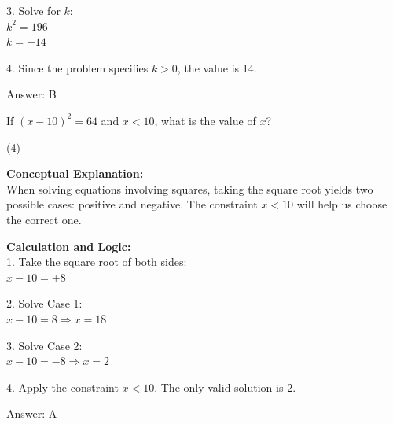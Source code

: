 \documentclass[11pt,paper=a4,answers]{exam}
\begin{document}
\begin{questions}
\begin{solution}
\vspace{10pt}

3. Solve for $k$: \\
   $k^2 = 196$ \\
   $k = \pm 14$

\vspace{10pt}

4. Since the problem specifies $k > 0$, the value is 14.

\vspace{20pt}

Answer: \colorbox{yellow!100}{B}
\end{solution}

\vspace{30pt}

\question
If $(x - 10)^2 = 64$ and $x < 10$, what is the value of $x$?
\begin{tasks}(4)
\end{tasks}

\begin{solution}
\textbf{Conceptual Explanation:} \\
When solving equations involving squares, taking the square root yields two possible cases: positive and negative. The constraint $x < 10$ will help us choose the correct one.

\vspace{15pt}

\textbf{Calculation and Logic:} \\
1. Take the square root of both sides: \\
   $x - 10 = \pm 8$

\vspace{10pt}

2. Solve Case 1: \\
   $x - 10 = 8 \Rightarrow x = 18$

\vspace{10pt}

3. Solve Case 2: \\
   $x - 10 = -8 \Rightarrow x = 2$

\vspace{10pt}

4. Apply the constraint $x < 10$. The only valid solution is 2.

\vspace{20pt}

Answer: \colorbox{yellow!100}{A}
\end{solution}


\end{questions}
\end{document}
